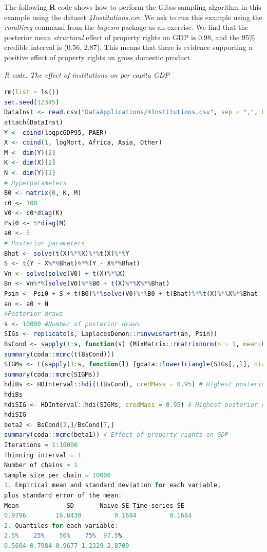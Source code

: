 The following \textbf{R} code shows how to perform the Gibss sampling algorithm in this example using the dataset \textit{4Institutions.csv}. We ask to run this example using the \textit{rmultireg} command from the \textit{bayesm} package as an exercise. We find that the posterior mean \textit{structural} effect of property rights on GDP is 0.98, and the 95\% credible interval is (0.56, 2.87). This means that there is evidence supporting a positive effect of property rights on gross domestic product. 

\begin{tcolorbox}[enhanced,width=4.67in,center upper,
	fontupper=\large\bfseries,drop shadow southwest,sharp corners]
	\textit{R code. The effect of institutions on per capita GDP}
	\begin{VF}
		\begin{lstlisting}[language=R]
rm(list = ls())
set.seed(12345)
DataInst <- read.csv("DataApplications/4Institutions.csv", sep = ",", header = TRUE, fileEncoding = "latin1")
attach(DataInst)
Y <- cbind(logpcGDP95, PAER)
X <- cbind(1, logMort, Africa, Asia, Other)
M <- dim(Y)[2]
K <- dim(X)[2]
N <- dim(Y)[1]
# Hyperparameters
B0 <- matrix(0, K, M)
c0 <- 100
V0 <- c0*diag(K)
Psi0 <- 5*diag(M)
a0 <- 5
# Posterior parameters
Bhat <- solve(t(X)%*%X)%*%t(X)%*%Y 
S <- t(Y - X%*%Bhat)%*%(Y - X%*%Bhat)
Vn <- solve(solve(V0) + t(X)%*%X) 
Bn <- Vn%*%(solve(V0)%*%B0 + t(X)%*%X%*%Bhat)
Psin <- Psi0 + S + t(B0)%*%solve(V0)%*%B0 + t(Bhat)%*%t(X)%*%X%*%Bhat - t(Bn)%*%solve(Vn)%*%Bn
an <- a0 + N
#Posterior draws
s <- 10000 #Number of posterior draws
SIGs <- replicate(s, LaplacesDemon::rinvwishart(an, Psin))
BsCond <- sapply(1:s, function(s) {MixMatrix::rmatrixnorm(n = 1, mean=Bn, U = Vn,V = SIGs[,,s])})
summary(coda::mcmc(t(BsCond)))
SIGMs <- t(sapply(1:s, function(l) {gdata::lowerTriangle(SIGs[,,l], diag=TRUE, byrow=FALSE)}))
summary(coda::mcmc(SIGMs))
hdiBs <- HDInterval::hdi(t(BsCond), credMass = 0.95) # Highest posterior density credible interval
hdiBs
hdiSIG <- HDInterval::hdi(SIGMs, credMass = 0.95) # Highest posterior density credible interval
hdiSIG
beta2 <- BsCond[2,]/BsCond[7,] 
summary(coda::mcmc(beta1)) # Effect of property rights on GDP
Iterations = 1:10000
Thinning interval = 1 
Number of chains = 1 
Sample size per chain = 10000 
1. Empirical mean and standard deviation for each variable,
plus standard error of the mean:
Mean             SD       Naive SE Time-series SE 
0.9796        16.8430         0.1684         0.1684 
2. Quantiles for each variable:
2.5%    25%    50%    75%  97.5% 
0.5604 0.7984 0.9677 1.2329 2.8709 
\end{lstlisting}
	\end{VF}
\end{tcolorbox} 

